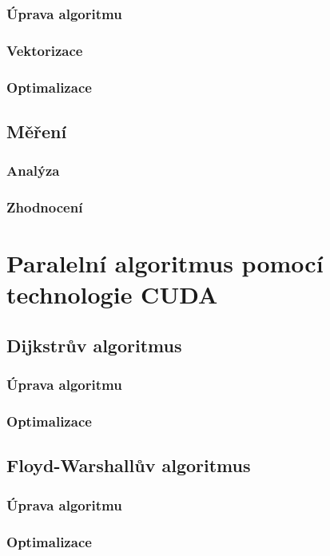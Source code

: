 \subsubsection{Úprava algoritmu}
\subsubsection{Vektorizace}
\subsubsection{Optimalizace}

\subsection{Měření}
\subsubsection{Analýza}
\subsubsection{Zhodnocení}




\section{Paralelní algoritmus pomocí technologie CUDA}
\subsection{Dijkstrův algoritmus}
\subsubsection{Úprava algoritmu}
\subsubsection{Optimalizace}

\subsection{Floyd-Warshallův algoritmus}
\subsubsection{Úprava algoritmu}
\subsubsection{Optimalizace}

